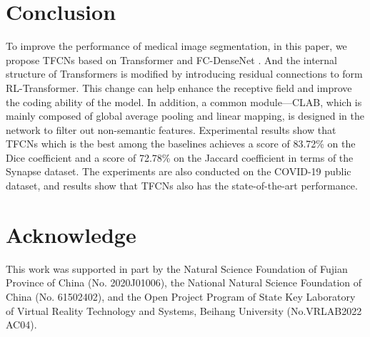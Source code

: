 \documentclass[runningheads]{llncs}
\begin{document}
\section{Conclusion}
\label{sec5}
To improve the performance of medical image segmentation, in this paper, we propose TFCNs based on Transformer \cite{vaswani2017attention} and FC-DenseNet \cite{zhang2018automatic}. And the internal structure of Transformers is modified by introducing residual connections to form RL-Transformer. This change can help enhance the receptive field and improve the coding ability of the model. In addition, a common module—CLAB, which is mainly composed of global average pooling and linear mapping, is designed in the network to filter out non-semantic features. Experimental results show that TFCNs which is the best among the baselines achieves a score of 83.72\% on the Dice coefficient and a score of 72.78\% on the Jaccard coefficient in terms of the Synapse dataset. The experiments are also conducted on the COVID-19 public dataset, and results show that TFCNs also has the state-of-the-art performance.

\section{Acknowledge}
\label{sec6}
This work was supported in part by the Natural Science Foundation of Fujian Province of China (No. 2020J01006), the National Natural Science Foundation of China (No. 61502402), and the Open Project Program of State Key Laboratory of Virtual Reality Technology and Systems, Beihang University (No.VRLAB2022\\AC04).
\end{document}

